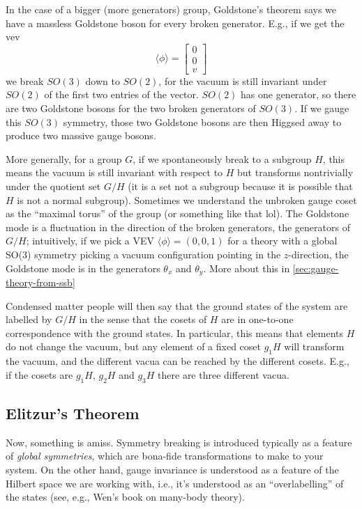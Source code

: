 \documentclass{report}
\begin{document}
 In the case of a bigger (more generators) 
group, Goldstone's theorem says we have a massless Goldstone boson for every 
broken generator. E.g., if we get the vev 
\begin{equation*}
	\langle \phi \rangle = \begin{bmatrix}
	0 \\ 0\\ v
	\end{bmatrix}
\end{equation*}
we break $ SO(3) $ down to $ SO(2) $, for the vacuum is still invariant under 
$ SO(2) $ of the first two entries of the vector. $ SO(2) $ has one generator,
so there are two Goldstone bosons for the two broken generators of $ SO(3) $. 
If we gauge this $ SO(3) $ symmetry, those two Goldstone bosons are then Higgsed
away to produce two massive gauge bosons. 

More generally, for a group $ G $, if we spontaneously break to a subgroup $ H $, 
this means the vacuum is still invariant with respect to $ H $ but transforms 
nontrivially under the quotient set $ G/H $ (it is a set not a subgroup because it is 
possible that $ H $ is not a normal subgroup).  Sometimes we understand the
unbroken gauge coset as the ``maximal torus'' of the group {\color{myred} (or
something like that lol)}. The Goldstone mode is a fluctuation in the direction
of the broken generators, the generators of $ G/H $; intuitively, if we pick a 
VEV $ \langle\phi\rangle = (0, 0, 1) $ for a theory with a global SO(3) symmetry
picking a vacuum configuration pointing in the $ z $-direction, the Goldstone 
mode is in the generators $ \theta_x $ and $ \theta_y $. More about this 
in \ref{sec:gauge-theory-from-ssb}

Condensed matter people will then say that the ground states of the system 
are labelled by $ G/H $ in the sense that the cosets of $ H $ are in one-to-one 
correspondence with the ground states. In particular, this means that elements 
$ H $ do not change the vacuum, but any element of a fixed coset $ g_1 H $ 
will transform the vacuum, and the different vacua can be reached by the different 
cosets. E.g., if the cosets are $ g_1 H $, $ g_2H $ and $ g_3 H $ there are three 
different vacua.

\subsection{Elitzur's Theorem}
Now, something is amiss. Symmetry breaking is introduced typically as a feature 
of \textit{global symmetries}, which are bona-fide transformations to make 
to your system. On the other hand, gauge invariance is understood as a 
feature of the Hilbert space we are working with, i.e., it's understood as an 
``overlabelling'' of the states (see, e.g., Wen's book on many-body theory). 
\end{document}
